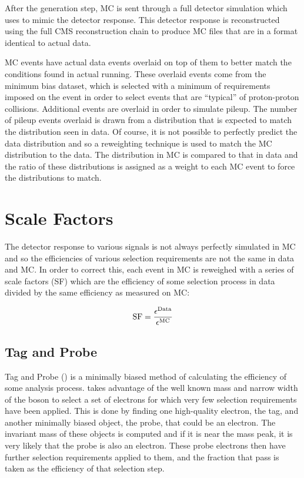After the generation step, MC is sent through a full detector simulation which
uses \GEANTfour \cite{agostinelli2003} to mimic the detector response. This
detector response is reconstructed using the full CMS reconstruction chain to
produce MC files that are in a format identical to actual data.

MC events have actual data events overlaid on top of them to better match the
conditions found in actual running. These overlaid events come from the minimum
bias dataset, which is selected with a minimum of requirements imposed on the
event in order to select events that are ``typical'' of proton-proton
collisions. Additional events are overlaid in order to simulate pileup. The
number of pileup events overlaid is drawn from a distribution that is expected
to match the distribution seen in data. Of course, it is not possible to
perfectly predict the data distribution and so a reweighting technique is used
to match the MC distribution to the data. The distribution in MC is compared to
that in data and the ratio of these distributions is assigned as a weight to
each MC event to force the distributions to match.

\section{Scale Factors}

The detector response to various signals is not always perfectly simulated in
MC and so the efficiencies of various selection requirements are not the same
in data and MC. In order to correct this, each event in MC is reweighed with a
series of scale factors (SF) which are the efficiency of some selection process
in data divided by the same efficiency as measured on MC:

\begin{equation}
    \label{eq:sf}
    \text{SF} = \frac{\epsilon^{\text{Data}}}{\epsilon^{\text{MC}}}
\end{equation}

\subsection{Tag and Probe}

Tag and Probe (\TnP) is a minimally biased method of calculating the efficiency
of some analysis process. \TnP takes advantage of the well known mass and
narrow width of the \Z boson to select a set of electrons for which very few
selection requirements have been applied. This is done by finding one
high-quality electron, the tag, and another minimally biased object, the probe,
that could be an electron. The invariant mass of these objects is computed and
if it is near the \Z mass peak, it is very likely that the probe is also an
electron. These probe electrons then have further selection requirements
applied to them, and the fraction that pass is taken as the efficiency of that
selection step.

